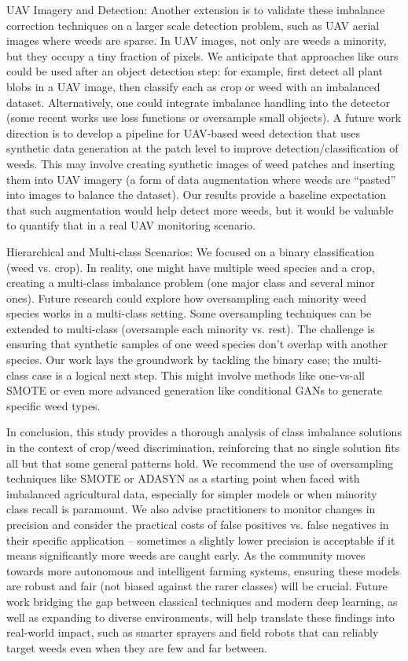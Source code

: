 \documentclass[agriengineering,article,submit,pdftex,moreauthors]{Definitions/mdpi}
\begin{document}
UAV Imagery and Detection: Another extension is to validate these imbalance correction techniques on a larger scale detection problem, such as UAV aerial images where weeds are sparse. In UAV images, not only are weeds a minority, but they occupy a tiny fraction of pixels. We anticipate that approaches like ours could be used after an object detection step: for example, first detect all plant blobs in a UAV image, then classify each as crop or weed with an imbalanced dataset. Alternatively, one could integrate imbalance handling into the detector (some recent works use loss functions or oversample small objects). A future work direction is to develop a pipeline for UAV-based weed detection that uses synthetic data generation at the patch level to improve detection/classification of weeds. This may involve creating synthetic images of weed patches and inserting them into UAV imagery (a form of data augmentation where weeds are “pasted” into images to balance the dataset). Our results provide a baseline expectation that such augmentation would help detect more weeds, but it would be valuable to quantify that in a real UAV monitoring scenario.

Hierarchical and Multi-class Scenarios: We focused on a binary classification (weed vs. crop). In reality, one might have multiple weed species and a crop, creating a multi-class imbalance problem (one major class and several minor ones). Future research could explore how oversampling each minority weed species works in a multi-class setting. Some oversampling techniques can be extended to multi-class (oversample each minority vs. rest). The challenge is ensuring that synthetic samples of one weed species don’t overlap with another species. Our work lays the groundwork by tackling the binary case; the multi-class case is a logical next step. This might involve methods like one-vs-all SMOTE or even more advanced generation like conditional GANs to generate specific weed types.

In conclusion, this study provides a thorough analysis of class imbalance solutions in the context of crop/weed discrimination, reinforcing that no single solution fits all but that some general patterns hold. We recommend the use of oversampling techniques like SMOTE or ADASYN as a starting point when faced with imbalanced agricultural data, especially for simpler models or when minority class recall is paramount. We also advise practitioners to monitor changes in precision and consider the practical costs of false positives vs. false negatives in their specific application – sometimes a slightly lower precision is acceptable if it means significantly more weeds are caught early. As the community moves towards more autonomous and intelligent farming systems, ensuring these models are robust and fair (not biased against the rarer classes) will be crucial. Future work bridging the gap between classical techniques and modern deep learning, as well as expanding to diverse environments, will help translate these findings into real-world impact, such as smarter sprayers and field robots that can reliably target weeds even when they are few and far between.
\end{document}
